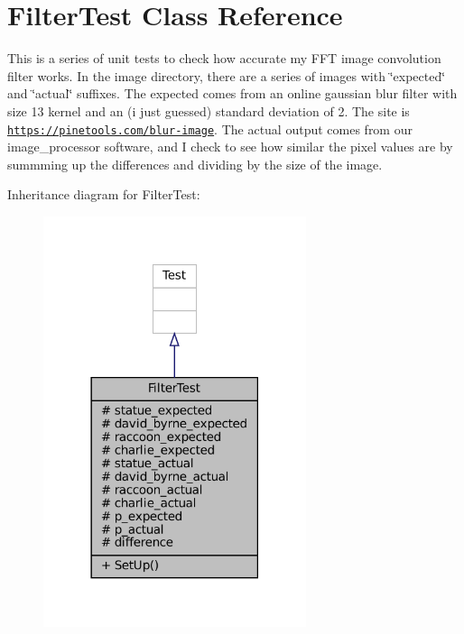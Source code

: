 \hypertarget{classFilterTest}{}\section{Filter\+Test Class Reference}
\label{classFilterTest}


This is a series of unit tests to check how accurate my F\+FT image convolution filter works. In the image directory, there are a series of images with \char`\"{}expected\char`\"{} and \char`\"{}actual\char`\"{} suffixes. The expected comes from an online gaussian blur filter with size 13 kernel and an (i just guessed) standard deviation of 2. The site is \href{https://pinetools.com/blur-image}{\tt https\+://pinetools.\+com/blur-\/image}. The actual output comes from our image\+\_\+processor software, and I check to see how similar the pixel values are by summming up the differences and dividing by the size of the image.  




Inheritance diagram for Filter\+Test\+:\nopagebreak
\begin{figure}[H]
\begin{center}
\leavevmode
\includegraphics[width=218pt]{classFilterTest__inherit__graph}
\end{center}
\end{figure}


